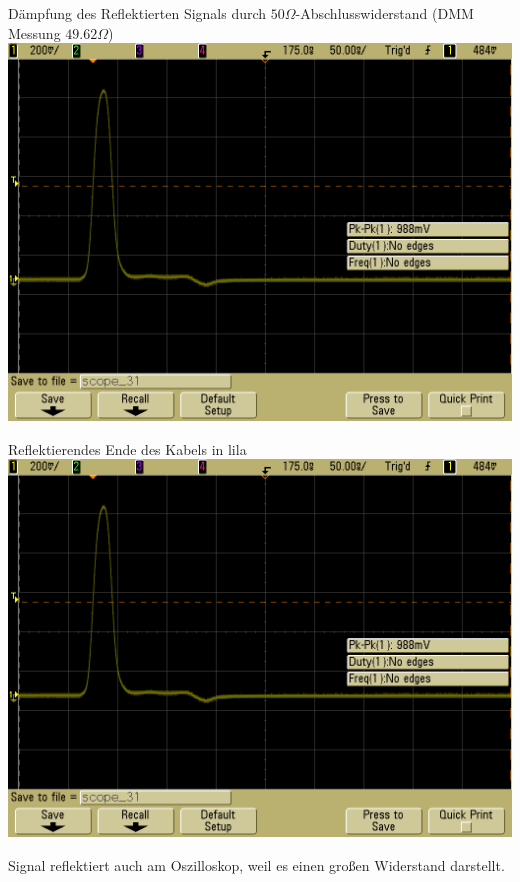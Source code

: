 \documentclass[compress,11pt]{beamer}
\begin{document}
\begin{frame}
\begin{block}{Dämpfung des Reflektierten Signals durch $50\Omega$-Abschlusswiderstand (DMM Messung $49.62\Omega$)}
\centering
\includegraphics[width=.85\textwidth]{../daten/scope_31.png}
\end{block}
\end{frame}
\begin{frame}
\begin{block}{Reflektierendes Ende des Kabels in lila}
\includegraphics[width=.85\textwidth]{../daten/scope_31.png}
\end{block}
\end{frame}
\begin{frame}
Signal reflektiert auch am Oszilloskop, weil es einen großen Widerstand darstellt.
\end{frame}
\end{document}
